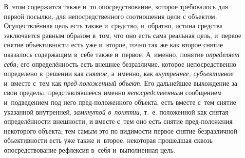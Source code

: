 В~этом содержится также и~то опосредствование, которое
требовалось для первой посылки, для непосредственного соотношения цели с
объектом. Осуществлённая цель есть также и~средство, и~обратно, истина
средства заключается равным образом в~том, что оно есть сама реальная цель,
и~первое снятие объективности есть уже и~второе, точно так же как второе
снятие оказалось содержащим в~себе также и~первое. А~именно, понятие
{\em определяет себя;} его определённость есть внешнее безразличие, которое
непосредственно определено в~решении как {\em снятое,} а~именно,
как {\em внутреннее, субъективное} и~вместе с~тем как {\em пред-положенный
объект}. Его дальнейшее выхождение за свои пределы, представлявшееся именно
{\em непосредственным}
сообщением и~подведением под него пред-положенного объекта,
есть вместе с~тем снятие указанной внутренней, {\em замкнутой в~понятии,}
т.~е. положенной как снятая определённости внешности, и
вместе с~тем оно есть снятие пред-положения некоторого объекта; тем самым
это по видимости первое снятие безразличной объективности
есть уже также и~второе, некоторая прошедшая сквозь опосредствование
рефлексия в~себя и~выполненная цель.

